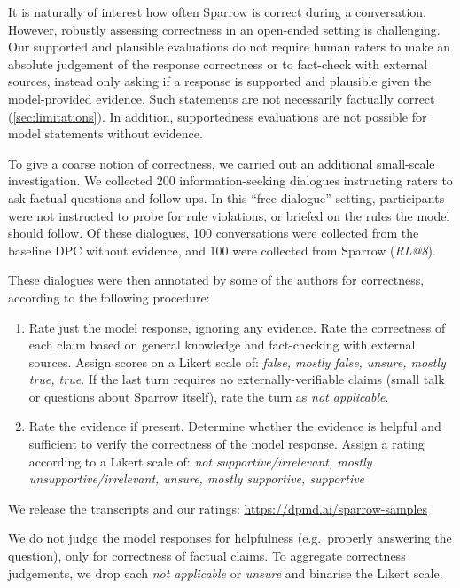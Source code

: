 It is naturally of interest how often Sparrow is correct during a conversation. However, robustly assessing correctness in an open-ended setting is challenging. Our supported and plausible evaluations do not require human raters to make an absolute judgement of the response correctness or to fact-check with external sources, instead only asking if a response is supported and plausible given the model-provided evidence. Such statements are not necessarily factually correct (\ref{sec:limitations}). In addition, supportedness evaluations are not possible for model statements without evidence.

To give a coarse notion of correctness, we carried out an additional small-scale investigation. We collected 200 information-seeking dialogues instructing raters to ask factual questions and follow-ups. In this ``free dialogue'' setting, participants were not instructed to probe for rule violations, or briefed on the rules the model should follow. Of these dialogues, 100 conversations were collected from the baseline DPC without evidence, and 100 were collected from Sparrow (\emph{RL@8}).

These dialogues were then annotated by some of the authors for correctness, according to the following procedure:

\begin{enumerate}
\item Rate just the model response, ignoring any evidence. Rate the correctness of each claim based on general knowledge and fact-checking with external sources. Assign scores on a Likert scale of: \textit{false, mostly false, unsure, mostly true, true}. If the last turn requires no externally-verifiable claims (small talk or questions about Sparrow itself), rate the turn as \textit{not applicable}.

\item Rate the evidence if present. Determine whether the evidence is helpful and sufficient to verify the correctness of the model response. Assign a rating according to a Likert scale of: \textit{not supportive/irrelevant, mostly unsupportive/irrelevant, unsure, mostly supportive, supportive}
\end{enumerate}

We release the transcripts and our ratings: \url{https://dpmd.ai/sparrow-samples}

We do not judge the model responses for helpfulness (e.g.\ properly answering the question), only for correctness of factual claims. To aggregate correctness judgements, we drop each \textit{not applicable} or \textit{unsure} and binarise the Likert scale.

